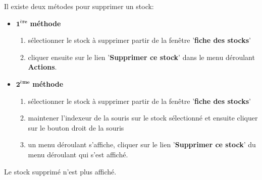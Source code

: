 Il existe deux m\'etodes pour supprimer un stock:
\begin{itemize}[]
	\item \textcolor{purplish}{$\mathbf{1^{\text{\`ere}}}$ \textbf{m\'ethode}}
	
	\begin{enumerate}[1)]
		\item s\'electionner le stock \`a supprimer partir de
		la fen\^etre '\textbf{fiche des stocks}'
		
		\item cliquer ensuite sur le lien '\textbf{Supprimer ce stock}'
		dans le menu d\'eroulant \textbf{Actions}.\\
	\end{enumerate}
	
	\item \textcolor{purplish}{$\mathbf{2^{\text{\`eme}}}$ \textbf{m\'ethode}}
	\begin{enumerate}[1)]
		\item s\'electionner le stock \`a supprimer partir de
			la fen\^etre '\textbf{fiche des stocks}'
		
		\item maintener l'indexeur de la souris sur le stock
			s\'electionn\'e et ensuite cliquer sur le bouton
			droit de la souris
				
		\item un menu d\'eroulant s'affiche, cliquer sur
			le lien '\textbf{Supprimer ce stock}' du menu
			d\'eroulant qui s'est affich\'e. \\
	\end{enumerate}	
\end{itemize}

Le stock supprim\'e n'est plus affich\'e.
